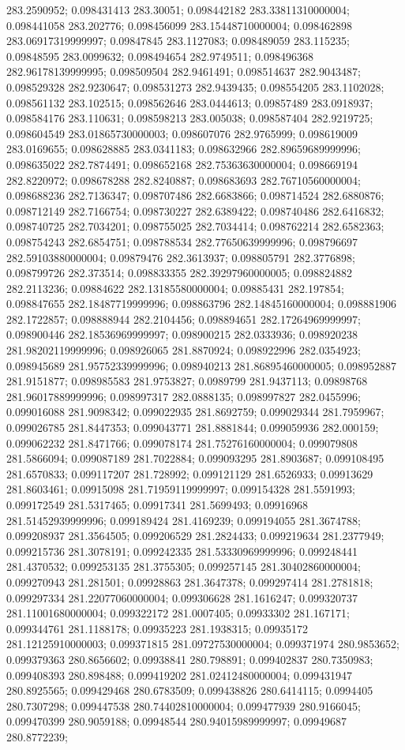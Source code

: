 283.2590952; 0.098431413 283.30051; 0.098442182 283.33811310000004; 0.098441058 283.202776; 0.098456099 283.15448710000004; 0.098462898 283.06917319999997; 0.09847845 283.1127083; 0.098489059 283.115235; 0.09848595 283.0099632; 0.098494654 282.9749511; 0.098496368 282.96178139999995; 0.098509504 282.9461491; 0.098514637 282.9043487; 0.098529328 282.9230647; 0.098531273 282.9439435; 0.098554205 283.1102028; 0.098561132 283.102515; 0.098562646 283.0444613; 0.09857489 283.0918937; 0.098584176 283.110631; 0.098598213 283.005038; 0.098587404 282.9219725; 0.098604549 283.01865730000003; 0.098607076 282.9765999; 0.098619009 283.0169655; 0.098628885 283.0341183; 0.098632966 282.89659689999996; 0.098635022 282.7874491; 0.098652168 282.75363630000004; 0.098669194 282.8220972; 0.098678288 282.8240887; 0.098683693 282.76710560000004; 0.098688236 282.7136347; 0.098707486 282.6683866; 0.098714524 282.6880876; 0.098712149 282.7166754; 0.098730227 282.6389422; 0.098740486 282.6416832; 0.098740725 282.7034201; 0.098755025 282.7034414; 0.098762214 282.6582363; 0.098754243 282.6854751; 0.098788534 282.77650639999996; 0.098796697 282.59103880000004; 0.09879476 282.3613937; 0.098805791 282.3776898; 0.098799726 282.373514; 0.098833355 282.39297960000005; 0.098824882 282.2113236; 0.09884622 282.13185580000004; 0.09885431 282.197854; 0.098847655 282.18487719999996; 0.098863796 282.14845160000004; 0.098881906 282.1722857; 0.098888944 282.2104456; 0.098894651 282.17264969999997; 0.098900446 282.18536969999997; 0.098900215 282.0333936; 0.098920238 281.98202119999996; 0.098926065 281.8870924; 0.098922996 282.0354923; 0.098945689 281.95752339999996; 0.098940213 281.86895460000005; 0.098952887 281.9151877; 0.098985583 281.9753827; 0.0989799 281.9437113; 0.09898768 281.96017889999996; 0.098997317 282.0888135; 0.098997827 282.0455996; 0.099016088 281.9098342; 0.099022935 281.8692759; 0.099029344 281.7959967; 0.099026785 281.8447353; 0.099043771 281.8881844; 0.099059936 282.000159; 0.099062232 281.8471766; 0.099078174 281.75276160000004; 0.099079808 281.5866094; 0.099087189 281.7022884; 0.099093295 281.8903687; 0.099108495 281.6570833; 0.099117207 281.728992; 0.099121129 281.6526933; 0.09913629 281.8603461; 0.09915098 281.71959119999997; 0.099154328 281.5591993; 0.099172549 281.5317465; 0.09917341 281.5699493; 0.09916968 281.51452939999996; 0.099189424 281.4169239; 0.099194055 281.3674788; 0.099208937 281.3564505; 0.099206529 281.2824433; 0.099219634 281.2377949; 0.099215736 281.3078191; 0.099242335 281.53330969999996; 0.099248441 281.4370532; 0.099253135 281.3755305; 0.099257145 281.30402860000004; 0.099270943 281.281501; 0.09928863 281.3647378; 0.099297414 281.2781818; 0.099297334 281.22077060000004; 0.099306628 281.1616247; 0.099320737 281.11001680000004; 0.099322172 281.0007405; 0.09933302 281.167171; 0.099344761 281.1188178; 0.09935223 281.1938315; 0.09935172 281.12125910000003; 0.099371815 281.09727530000004; 0.099371974 280.9853652; 0.099379363 280.8656602; 0.09938841 280.798891; 0.099402837 280.7350983; 0.099408393 280.898488; 0.099419202 281.02412480000004; 0.099431947 280.8925565; 0.099429468 280.6783509; 0.099438826 280.6414115; 0.0994405 280.7307298; 0.099447538 280.74402810000004; 0.099477939 280.9166045; 0.099470399 280.9059188; 0.09948544 280.94015989999997; 0.09949687 280.8772239; 